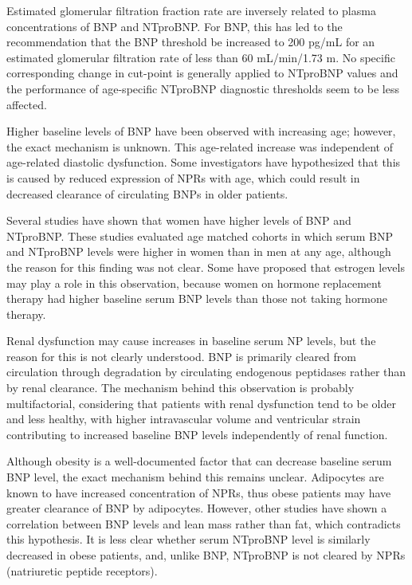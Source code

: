 \documentclass[14pt,a4paper,onecolumn]{extarticle}
\begin{document}
Estimated glomerular filtration fraction rate are inversely related to plasma concentrations of BNP and NTproBNP. For BNP, this has led to the recommendation that the BNP threshold be increased to 200 pg/mL for an estimated glomerular filtration rate of less than 60 mL/min/1.73 m. No specific corresponding change in cut-point is generally applied to NTproBNP values and the performance of age-specific NTproBNP diagnostic thresholds seem to be less affected. \citep{DeFilippi2008}

Higher baseline levels of BNP have been observed with increasing age; however, the exact mechanism is unknown. This age-related increase was independent of age-related diastolic dysfunction. Some investigators have hypothesized that this is caused by reduced expression of NPRs with age, which could result in decreased clearance of circulating BNPs in older patients. \citep{Maisel2018}

Several studies have shown that women have higher levels of BNP and NTproBNP. These studies evaluated age matched cohorts in which serum BNP and NTproBNP levels were higher in women than in men at any age, although the reason for this finding was not clear. Some have proposed that estrogen levels may play a role in this observation, because women on hormone replacement therapy had higher baseline serum BNP levels than those not taking hormone therapy. \citep{Maisel2018}

Renal dysfunction may cause increases in baseline serum NP levels, but the reason for this is not clearly understood. BNP is primarily cleared from circulation through degradation by circulating endogenous peptidases rather than by renal clearance. The mechanism behind this observation is probably multifactorial, considering that patients with renal dysfunction tend to be older and less healthy, with higher intravascular volume and ventricular strain contributing to increased baseline BNP levels independently of renal function. \citep{Maisel2018}

Although obesity is a well-documented factor that can decrease baseline serum BNP level, the exact mechanism behind this remains unclear.  Adipocytes are known to have increased concentration of NPRs, thus obese patients may have greater clearance of BNP by adipocytes. However, other studies have shown a correlation between BNP levels and lean mass rather than fat, which contradicts this hypothesis.  It is less clear whether serum NTproBNP level is similarly decreased in obese patients, and, unlike BNP, NTproBNP is not cleared by NPRs (natriuretic peptide receptors). \citep{Maisel2018}
\end{document}
